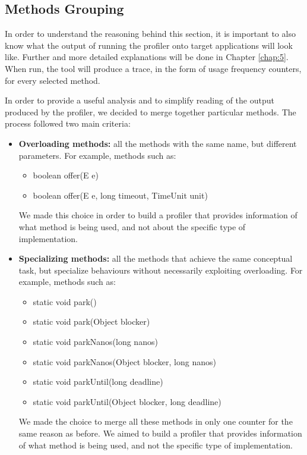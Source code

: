 \documentclass[]{usiinfthesis}
\begin{document}
 
 \subsection{Methods Grouping}
 
 In order to understand the reasoning behind this section, it is important to also know what the output of running the profiler onto target applications will look like. Further and more detailed explanations will be done in Chapter \ref{chap:5}. When run, the tool will produce a trace, in the form of usage frequency counters, for every selected method.
 
 In order to provide a useful analysis and to simplify reading of the output produced by the profiler, we decided to merge together particular methods. The process followed two main criteria:
 \begin{itemize}
     \item \textbf{Overloading methods: }all the methods with the same name, but different parameters. For example, methods such as:
     \begin{itemize}
         \item boolean offer(E e)
         \item boolean offer(E e, long timeout, TimeUnit unit)
     \end{itemize}
     We made this choice in order to build a profiler that provides information of what method is being used, and not about the specific type of implementation.
 \end{itemize}
 \begin{itemize}
     \item \textbf{Specializing methods: }all the methods that achieve the same conceptual task, but specialize behaviours without necessarily exploiting overloading. For example, methods such as:
     \begin{itemize}
         \item static void park()
         \item static void park(Object blocker)
         \item static void parkNanos(long nanos)
         \item static void parkNanos(Object blocker, long nanos)
         \item static void parkUntil(long deadline)
         \item static void parkUntil(Object blocker, long deadline)
     \end{itemize}
     We made the choice to merge all these methods in only one counter for the same reason as before. We aimed to build a profiler that provides information of what method is being used, and not the specific type of implementation.
 \end{itemize}
 
\end{document}
